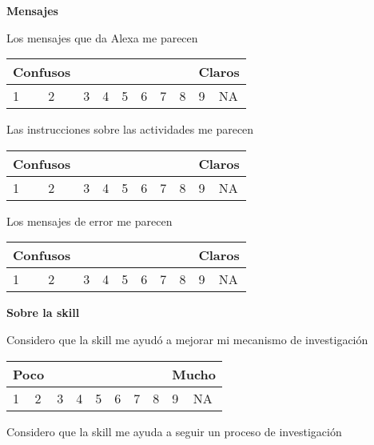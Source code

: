 \begin{tcolorbox}[colback=white!25!white,colframe=blue]
  \textbf{Mensajes}

  Los mensajes que da Alexa me parecen

  \begin{tabular}{| p{1cm} | p{1cm} | p{1cm} | p{1cm} | p{1cm} | p{1cm} | p{1cm} | p{1cm} | p{1cm} | p{1cm} |}
    \multicolumn{2}{p{1cm}}{Confusos} & \multicolumn{6}{p{1cm}}{} & \multicolumn{2}{p{1cm}}{Claros} \\ \hline
    1 & 2 & 3 & 4 & 5 & 6 & 7 & 8 & 9 & NA \\ \hline
  \end{tabular}

  Las instrucciones sobre las actividades me parecen

  \begin{tabular}{| p{1cm} | p{1cm} | p{1cm} | p{1cm} | p{1cm} | p{1cm} | p{1cm} | p{1cm} | p{1cm} | p{1cm} |}
    \multicolumn{2}{p{1cm}}{Confusos} & \multicolumn{6}{p{1cm}}{} & \multicolumn{2}{p{1cm}}{Claros} \\ \hline
    1 & 2 & 3 & 4 & 5 & 6 & 7 & 8 & 9 & NA \\ \hline
  \end{tabular}

  Los mensajes de error me parecen

  \begin{tabular}{| p{1cm} | p{1cm} | p{1cm} | p{1cm} | p{1cm} | p{1cm} | p{1cm} | p{1cm} | p{1cm} | p{1cm} |}
    \multicolumn{2}{p{1cm}}{Confusos} & \multicolumn{6}{p{1cm}}{} & \multicolumn{2}{p{1cm}}{Claros} \\ \hline
    1 & 2 & 3 & 4 & 5 & 6 & 7 & 8 & 9 & NA \\ \hline
  \end{tabular}

  \hfill

  \textbf{Sobre la skill}

  Considero que la skill me ayudó a mejorar mi mecanismo de investigación

  \begin{tabular}{| p{1cm} | p{1cm} | p{1cm} | p{1cm} | p{1cm} | p{1cm} | p{1cm} | p{1cm} | p{1cm} | p{1cm} |}
    \multicolumn{2}{p{1cm}}{Poco} & \multicolumn{6}{p{1cm}}{} & \multicolumn{2}{p{1cm}}{Mucho} \\ \hline
    1 & 2 & 3 & 4 & 5 & 6 & 7 & 8 & 9 & NA \\ \hline
  \end{tabular}

  Considero que la skill me ayuda a seguir un proceso de investigación


\end{tcolorbox}
